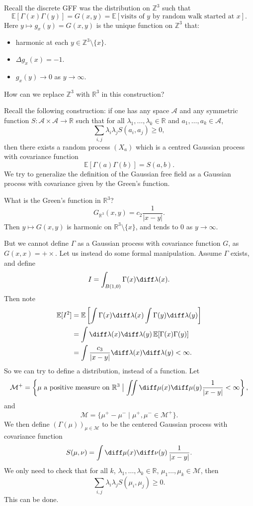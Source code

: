 \documentclass[12pt]{article}
\begin{document}
Recall the discrete GFF was the distribution on $\mathbb{Z}^3$ such that
\[
	\mathbb{E}[ \Gamma(x) \Gamma(y)] = G(x, y) = \mathbb{E}[\text{visits of $y$ by random walk started at $x$}].
\]
Here $y \mapsto g_x(y) = G(x, y)$ is the unique function on $\mathbb{Z}^3$ that:
\begin{itemize}
	\item harmonic at each $y \in \mathbb{Z}^3 \setminus \{x\}$.
	\item $\Delta g_x(x) = -1$.
	\item $g_x(y) \to 0$ as $y \to \infty$.
\end{itemize}

How can we replace $\mathbb{Z}^3$ with $\mathbb{R}^3$ in this construction?

Recall the following construction: if one has any space $\mathcal{A}$ and any symmetric function $S : \mathcal{A} \times \mathcal{A} \to \mathbb{R}$ such that for all $\lambda_1, \ldots, \lambda_k \in \mathbb{R}$ and $a_1, \ldots, a_k \in \mathcal{A}$,
\[
\sum_{i, j} \lambda_i \lambda_j S(a_i, a_j) \geq 0,
\]
then there exists a random process $(X_a)$ which is a centred Gaussian process with covariance function
\[
\mathbb{E}[\Gamma(a) \Gamma(b)] = S(a, b).
\]
We try to generalize the definition of the Gaussian free field as a Gaussian process with covariance given by the Green's function.

What is the Green's function in $\mathbb{R}^3$?
\[
G_{\mathbb{R}^3}(x, y) = c_2 \frac{1}{|x-y|}.
\]
Then $y \mapsto G(x, y)$ is harmonic on $\mathbb{R}^3 \setminus \{x\}$, and tends to $0$ as $y \to \infty$.

But we cannot define $\Gamma$ as a Gaussian process with covariance function $G$, as $G(x, x) = +\times$. Let us instead do some formal manipulation. Assume $\Gamma$ exists, and define
\[
I = \int_{B(1, 0)} \Gamma(x) \diff \lambda(x).
\]
Then note
\begin{align*}
	\mathbb{E}[I^2] &= \mathbb{E}\left[ \int \Gamma(x) \diff \lambda(x) \int \Gamma(y) \diff \lambda(y) \right] \\
			&= \int \diff \lambda(x) \diff \lambda(y) \, \mathbb{E}[\Gamma(x) \Gamma(y)] \\
			&= \int \frac{c_3}{|x-y|} \diff \lambda(x) \diff \lambda(y) < \infty.
\end{align*}
So we can try to define a distribution, instead of a function. Let
\[
	\mathcal{M}^{+} = \left\{ \mu \text{ a positive measure on } \mathbb{R}^3 \bigm| \iint \diff \mu(x) \diff \mu(y) \frac{1}{|x - y|} < \infty \right\},
\]
and
\[
	\mathcal{M} = \{\mu^{+} - \mu^{-} \mid \mu^{+}, \mu^{-} \in \mathcal{M}^{+}\}.
\]
We then define $(\Gamma(\mu))_{\mu \in \mathcal{M}}$ to be the centered Gaussian process with covariance function
\[
S(\mu, \nu) = \int \diff \mu(x) \diff \nu(y) \, \frac{1}{|x - y|}.
\]
We only need to check that for all $k$, $\lambda_1, \ldots, \lambda_k \in \mathbb{R}$, $\mu_1 \ldots, \mu_k \in \mathcal{M}$, then
\[
\sum_{i, j} \lambda_i \lambda_j S(\mu_i, \mu_j) \geq 0.
\]
This can be done.
\end{document}
